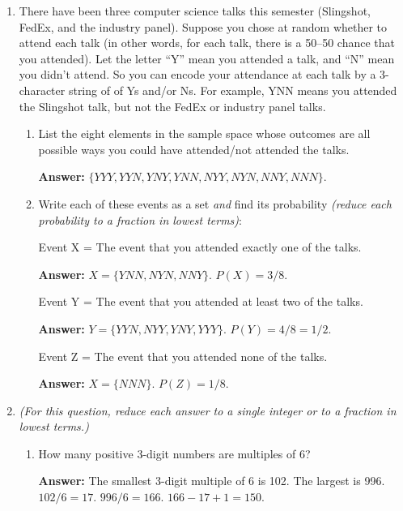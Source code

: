 \documentclass[11pt, letterpaper]{report}
\begin{document}
\begin{enumerate}



\item There have been three computer science talks this semester (Slingshot, FedEx, and the industry panel).  Suppose you 
chose at random whether to attend each talk (in other words, for each talk, there is a 50--50 chance that you attended).  Let the letter ``Y''
mean you attended a talk, and ``N'' mean you didn't attend.  So you can encode your attendance at each talk by a 3-character
string of of Ys and/or Ns.  For example, YNN means you attended the Slingshot talk, but not the FedEx or industry
panel talks.  

\begin{enumerate}
        \item List the eight elements in the sample space whose outcomes are all possible ways you could have attended/not 
        attended the talks. 
        
        \textbf{Answer:} $\{YYY,YYN,YNY,YNN,NYY,NYN,NNY,NNN\}$.
        
        \item Write each of these events as a set \emph{and}
find its probability \emph{(reduce each probability to a fraction in lowest terms)}: 
        
        Event X = The event that you attended exactly one of the talks. 
        
        \textbf{Answer:} $X = \{YNN, NYN, NNY\}$.  $P(X) = 3/8$.
        
        Event Y = The event that you attended at least two of the talks.
                
        \textbf{Answer:} $Y = \{YYN, NYY, YNY, YYY\}$.  $P(Y) = 4/8=1/2$.
        
        Event Z = The event that you attended none of the talks.
                
        \textbf{Answer:} $X = \{NNN\}$.  $P(Z) = 1/8$.
        
\end{enumerate}
        
\item \emph{(For this question, reduce each answer to a single integer or to a fraction in lowest terms.)}\begin{enumerate} 
 \item How many positive 3-digit numbers are multiples of 6? 
 
 \textbf{Answer:}  The smallest 3-digit multiple of 6 is 102.  The largest is 996.  $102/6=17$.  $996/6=166$.  $166-17+1=150$.
 

\end{enumerate}
\end{enumerate}
\end{document}
